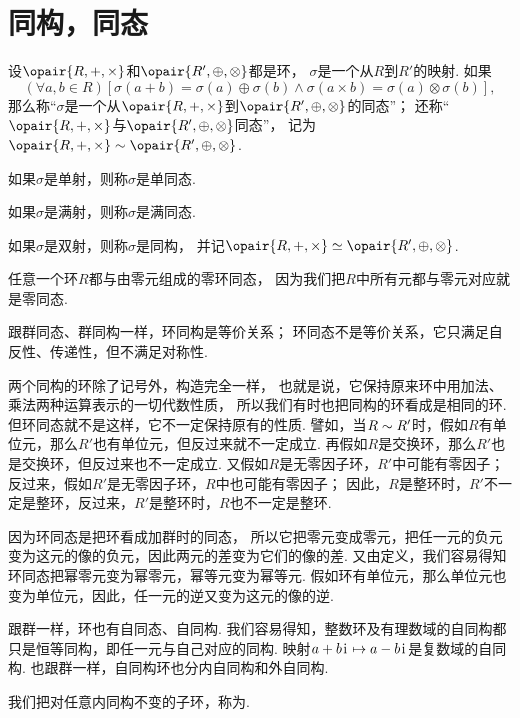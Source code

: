 \section{同构，同态}
\begin{definition}
设\(\opair{R,+,\times}\)和\(\opair{R',\oplus,\otimes}\)都是环，
\(\sigma\)是一个从\(R\)到\(R'\)的映射.
如果\[
	(\forall a,b\in R)[
		\sigma(a+b)=\sigma(a)\oplus\sigma(b)
		\land
		\sigma(a \times b)=\sigma(a)\otimes\sigma(b)
	],
\]
那么称“\(\sigma\)是一个从\(\opair{R,+,\times}\)到\(\opair{R',\oplus,\otimes}\)的同态”；
还称“\(\opair{R,+,\times}\)与\(\opair{R',\oplus,\otimes}\)同态”，
记为\(\opair{R,+,\times} \Homomorphism \opair{R',\oplus,\otimes}\).

如果\(\sigma\)是单射，则称\(\sigma\)是单同态.

如果\(\sigma\)是满射，则称\(\sigma\)是满同态.

如果\(\sigma\)是双射，则称\(\sigma\)是同构，
并记\(\opair{R,+,\times} \Isomorphism \opair{R',\oplus,\otimes}\).
\end{definition}

任意一个环\(R\)都与由零元组成的零环同态，
因为我们把\(R\)中所有元都与零元对应就是零同态.

跟群同态、群同构一样，环同构是等价关系；
环同态不是等价关系，它只满足自反性、传递性，但不满足对称性.

两个同构的环除了记号外，构造完全一样，
也就是说，它保持原来环中用加法、乘法两种运算表示的一切代数性质，
所以我们有时也把同构的环看成是相同的环.
但环同态就不是这样，它不一定保持原有的性质.
譬如，当\(R \sim R'\)时，假如\(R\)有单位元，那么\(R'\)也有单位元，但反过来就不一定成立.
再假如\(R\)是交换环，那么\(R'\)也是交换环，但反过来也不一定成立.
又假如\(R\)是无零因子环，\(R'\)中可能有零因子；
反过来，假如\(R'\)是无零因子环，\(R\)中也可能有零因子；
因此，\(R\)是整环时，\(R'\)不一定是整环，反过来，\(R'\)是整环时，\(R\)也不一定是整环.

因为环同态是把环看成加群时的同态，
所以它把零元变成零元，把任一元的负元变为这元的像的负元，因此两元的差变为它们的像的差.
又由定义，我们容易得知环同态把幂零元变为幂零元，幂等元变为幂等元.
假如环有单位元，那么单位元也变为单位元，因此，任一元的逆又变为这元的像的逆.

跟群一样，环也有自同态、自同构.
我们容易得知，整数环及有理数域的自同构都只是恒等同构，即任一元与自己对应的同构.
映射\(a+b\kern1pt\mathrm{i}\kern1pt \mapsto a-b\kern1pt\mathrm{i}\kern1pt\)是复数域的自同构.
也跟群一样，自同构环也分内自同构和外自同构.

我们把对任意内同构不变的子环，称为.
